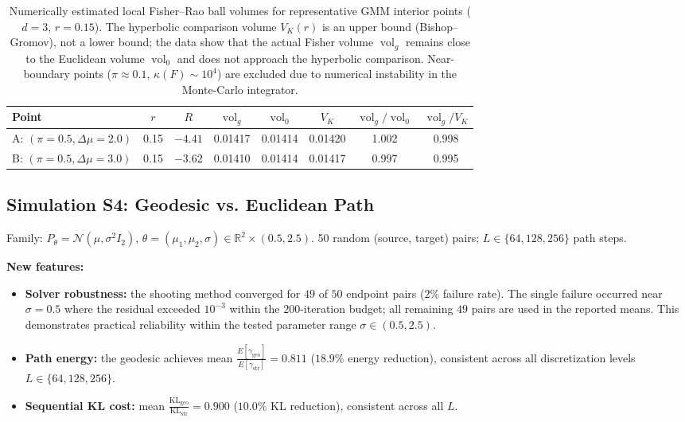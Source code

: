 \documentclass[a4paper,fleqn]{cas-dc}
\DeclareMathOperator{\vol}{vol}
\newcommand{\R}{\mathbb{R}}
\begin{document}
\begin{table}[t]
  \centering
  \caption{Numerically estimated local Fisher--Rao ball volumes for
    representative GMM interior points ($d=3$, $r=0.15$).
    The hyperbolic comparison volume $V_K(r)$ is an upper bound
    (Bishop--Gromov), not a lower bound; the data show that the actual
    Fisher volume $\vol_g$ remains close to the Euclidean volume $\vol_0$
    and does not approach the hyperbolic comparison.
    Near-boundary points ($\pi\approx 0.1$, $\kappa(F)\sim 10^4$) are
    excluded due to numerical instability in the Monte-Carlo integrator.}
  \label{tab:fisher_ball_volumes}
  \small
  \setlength{\tabcolsep}{3.5pt}
  \begin{tabular}{@{}lccccccc@{}}
    \toprule
    Point & $r$ & $R$ & $\vol_g$ & $\vol_0$ & $V_K$ & $\vol_g/\vol_0$ & $\vol_g/V_K$ \\
    \midrule
    A: $(\pi=0.5,\Delta\mu=2.0)$ & 0.15 & $-4.41$ & 0.01417 & 0.01414 & 0.01420 & 1.002 & 0.998 \\
    B: $(\pi=0.5,\Delta\mu=3.0)$ & 0.15 & $-3.62$ & 0.01410 & 0.01414 & 0.01417 & 0.997 & 0.995 \\
    \bottomrule
  \end{tabular}
\end{table}
\subsection{Simulation S4: Geodesic vs. Euclidean Path}
\label{sec:sim_s4}

Family: $P_\theta=\mathcal{N}(\mu,\sigma^2 I_2)$,
$\theta=(\mu_1,\mu_2,\sigma)\in\R^2\times(0.5,2.5)$.
50 random (source, target) pairs; $L\in\{64,128,256\}$ path steps.

\textbf{New features:}
\begin{itemize}
  \item \textbf{Solver robustness:} the shooting method converged for
        $49$ of $50$ endpoint pairs ($2\%$ failure rate).
        The single failure occurred near $\sigma = 0.5$ where the
        residual exceeded $10^{-3}$ within the $200$-iteration budget;
        all remaining $49$ pairs are used in the reported means.
        This demonstrates practical reliability within the tested
        parameter range $\sigma \in (0.5, 2.5)$.
  \item \textbf{Path energy:} the geodesic achieves mean
        $\frac{E[\gamma_{\mathrm{geo}}]}{E[\gamma_{\mathrm{str}}]} = 0.811$
        ($18.9\%$ energy reduction), consistent across all
        discretization levels $L \in \{64, 128, 256\}$.
  \item \textbf{Sequential KL cost:} mean
        $\frac{\mathrm{KL}_{\mathrm{geo}}}{\mathrm{KL}_{\mathrm{str}}} = 0.900$
        ($10.0\%$ KL reduction), consistent across all $L$.
\end{itemize}
\end{document}
